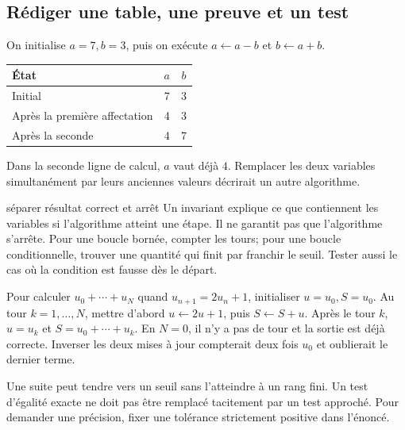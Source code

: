 
\subsection*{Rédiger une table, une preuve et un test}
\begin{exemple}
On initialise $a=7,b=3$, puis on exécute $a\leftarrow a-b$ et $b\leftarrow a+b$.
\begin{center}\begin{tabular}{l|cc}\toprule
État&$a$&$b$\\\midrule
Initial&7&3\\Après la première affectation&4&3\\Après la seconde&4&7\\\bottomrule
\end{tabular}\end{center}
Dans la seconde ligne de calcul, $a$ vaut déjà $4$. Remplacer les deux variables simultanément par leurs anciennes valeurs décrirait un autre algorithme.
\end{exemple}
\begin{methode}{séparer résultat correct et arrêt}
Un invariant explique ce que contiennent les variables si l’algorithme atteint une étape. Il ne garantit pas que l’algorithme s’arrête. Pour une boucle bornée, compter les tours; pour une boucle conditionnelle, trouver une quantité qui finit par franchir le seuil. Tester aussi le cas où la condition est fausse dès le départ.
\end{methode}
\begin{exemple}
Pour calculer $u_0+\cdots+u_N$ quand $u_{n+1}=2u_n+1$, initialiser $u=u_0,S=u_0$. Au tour $k=1,\ldots,N$, mettre d’abord $u\leftarrow2u+1$, puis $S\leftarrow S+u$. Après le tour $k$, $u=u_k$ et $S=u_0+\cdots+u_k$. En $N=0$, il n’y a pas de tour et la sortie est déjà correcte. Inverser les deux mises à jour compterait deux fois $u_0$ et oublierait le dernier terme.
\end{exemple}
\begin{avertissement}
Une suite peut tendre vers un seuil sans l’atteindre à un rang fini. Un test d’égalité exacte ne doit pas être remplacé tacitement par un test approché. Pour demander une précision, fixer une tolérance strictement positive dans l’énoncé.
\end{avertissement}

